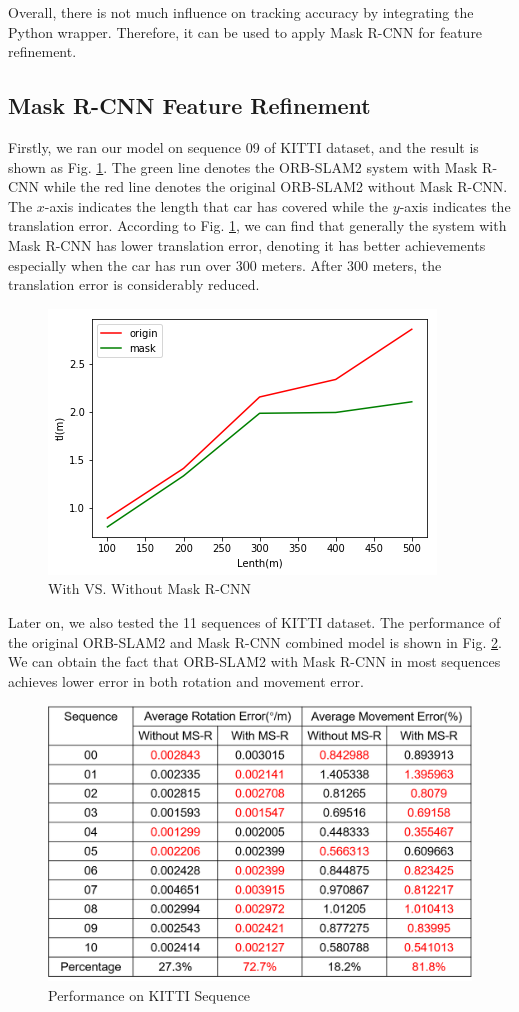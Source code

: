 \documentclass[letterpaper, 10 pt, conference]{IEEEtran}
\begin{document}
Overall, there is not much influence on tracking accuracy by integrating the
Python wrapper. Therefore, it can be used to apply Mask R-CNN for feature
refinement. 

\subsection{Mask R-CNN Feature Refinement} \label{sect:\thesubsection}
Firstly, we ran our model on sequence 09 of KITTI dataset, and the result is
shown as Fig. \ref{fig:2}. The green line denotes the ORB-SLAM2 system with Mask
R-CNN while the red line denotes the original ORB-SLAM2 without Mask R-CNN. The
$x$-axis indicates the length that car has covered while the $y$-axis indicates
the translation error. According to Fig. \ref{fig:2}, we can find that generally
the system with Mask R-CNN has lower translation error, denoting it has better
achievements especially when the car has run over 300 meters. After 300 meters,
the translation error is considerably reduced. 
\begin{figure}[ht]
\includegraphics[scale=0.85]{images/Evaluation/FeatureRefine/compare.png}
\caption{With VS. Without Mask R-CNN}
\label{fig:2}
\end{figure}

Later on, we also tested the 11 sequences of KITTI dataset. The performance of
the original ORB-SLAM2 and Mask R-CNN combined model is shown in Fig.
\ref{fig:3}. We can obtain the fact that ORB-SLAM2 with Mask R-CNN in most
sequences achieves lower error in both rotation and movement error. 
\begin{figure}[ht]
\includegraphics[scale=0.39]{images/Evaluation/FeatureRefine/versus.png}
\caption{Performance on KITTI Sequence}
\label{fig:3}
\end{figure}
\end{document}
